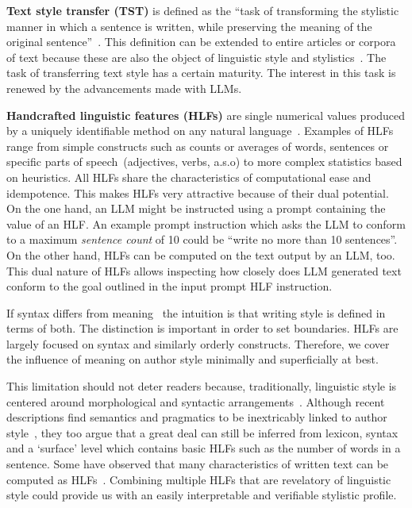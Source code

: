 \documentclass[a4paper,twoside]{article}
\begin{document}
\textbf{Text style transfer (TST)} is defined as the ``task of transforming the
stylistic manner in which a sentence is written, while preserving the meaning of
the original sentence''~\cite{tst-review-2021}.
This definition can be extended to entire articles or corpora of text because
these are also the object of linguistic style and
stylistics~\cite{lugea2023stylistics}.
The task of transferring text style has a certain maturity.
The interest in this task is renewed by the advancements made with LLMs.

\textbf{Handcrafted linguistic features (HLFs)} are single numerical values
produced by a uniquely identifiable method on any natural
language~\cite{lftk-2023}.
Examples of HLFs range from simple constructs such as counts or averages of
words, sentences or specific parts of speech~(adjectives, verbs, a.s.o) to more
complex statistics based on heuristics.
All HLFs share the characteristics of computational ease and idempotence.
This makes HLFs very attractive because of their dual potential.
On the one hand, an LLM might be instructed using a prompt containing the value
of an HLF.\@
An example prompt instruction which asks the LLM to conform to a maximum
\textit{sentence count} of 10 could be ``write no more than 10 sentences''.
On the other hand, HLFs can be computed on the text output by an LLM, too.
This dual nature of HLFs allows inspecting how closely does LLM generated text
conform to the goal outlined in the input prompt HLF instruction.\@

If syntax differs from meaning~\cite{chomsky2002syntactic} the intuition is that
writing style is defined in terms of both.
The distinction is important in order to set boundaries.
HLFs are largely focused on syntax and similarly orderly constructs.
Therefore, we cover the influence of meaning on author style minimally and
superficially at best.

This limitation should not deter readers because, traditionally, linguistic
style is centered around morphological and syntactic
arrangements~\cite{lugea2023stylistics}.
Although recent descriptions find semantics and pragmatics to be inextricably
linked to author style~\cite{verma2019lexical}, they too argue that a great deal
can still be inferred from lexicon, syntax and a `surface' level which contains
basic HLFs such as the number of words in a sentence.
Some have observed that many characteristics of written text can be computed as
HLFs~\cite{hovy1987generating,lugea2023stylistics}.
Combining multiple HLFs that are revelatory of linguistic style could provide us
with an easily interpretable and verifiable stylistic profile.
\end{document}
